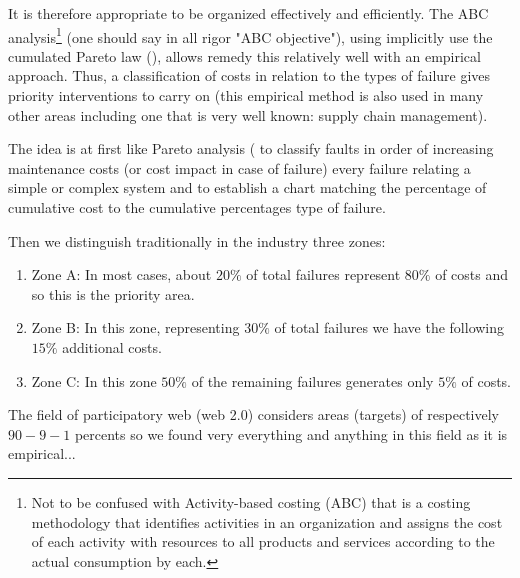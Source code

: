 	It is therefore appropriate to be organized effectively and efficiently. The ABC analysis\footnote{Not to be confused with Activity-based costing (ABC) that is a costing methodology that identifies activities in an organization and assigns the cost of each activity with resources to all products and services according to the actual consumption by each.} (one should say in all rigor "ABC objective"), using implicitly use the cumulated Pareto law (), allows remedy this relatively well with an empirical approach. Thus, a classification of costs in relation to the types of failure gives priority interventions to carry on (this empirical method is also used in many other areas including one that is very well known: supply chain management).
	
	The idea is at first like Pareto analysis ( to classify faults in order of increasing maintenance costs (or cost impact in case of failure) every failure relating a simple or complex system and to establish a chart matching the percentage of cumulative cost  to the cumulative percentages type of failure.
	
	Then we distinguish traditionally in the industry three zones:
	\begin{enumerate}
		\item Zone A: In most cases, about $20\%$ of total failures represent $80\%$ of costs and so this is the priority area.
		
		\item Zone B: In this zone, representing $30\%$ of total failures we have the following $15\%$ additional costs.
		
		\item Zone C: In this zone $50\%$ of the remaining failures generates only $5\%$ of costs.
	\end{enumerate}
	The field of participatory web (web 2.0) considers areas (targets) of respectively $90-9-1$ percents so we found very everything and anything in this field as it is empirical...
	
